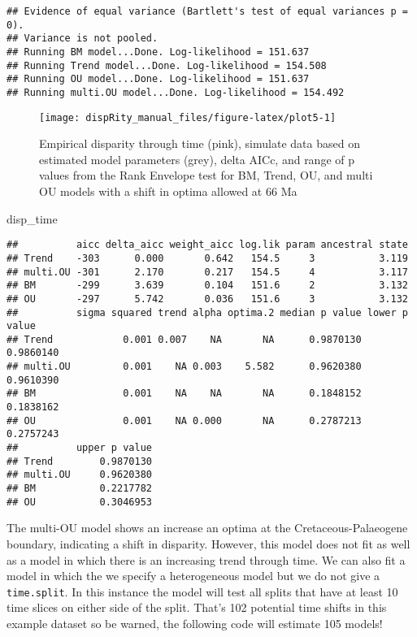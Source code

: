 \documentclass[
]{book}
\newenvironment{Shaded}{\begin{snugshade}}{\end{snugshade}}
\newcommand{\NormalTok}[1]{#1}
\begin{document}
\begin{verbatim}
## Evidence of equal variance (Bartlett's test of equal variances p = 0).
## Variance is not pooled.
## Running BM model...Done. Log-likelihood = 151.637
## Running Trend model...Done. Log-likelihood = 154.508
## Running OU model...Done. Log-likelihood = 151.637
## Running multi.OU model...Done. Log-likelihood = 154.492
\end{verbatim}

\begin{figure}

{\centering \texttt{[image: dispRity\_manual\_files/figure-latex/plot5-1]} 

}

\caption{Empirical disparity through time (pink), simulate data based on estimated model parameters (grey), delta AICc, and range of p values from the Rank Envelope test for BM, Trend, OU, and multi OU models with a shift in optima allowed at 66 Ma}\label{fig:plot5}
\end{figure}

\begin{Shaded}
\begin{Highlighting}[]
\NormalTok{disp\_time}
\end{Highlighting}
\end{Shaded}

\begin{verbatim}
##          aicc delta_aicc weight_aicc log.lik param ancestral state
## Trend    -303      0.000       0.642   154.5     3           3.119
## multi.OU -301      2.170       0.217   154.5     4           3.117
## BM       -299      3.639       0.104   151.6     2           3.132
## OU       -297      5.742       0.036   151.6     3           3.132
##          sigma squared trend alpha optima.2 median p value lower p value
## Trend            0.001 0.007    NA       NA      0.9870130     0.9860140
## multi.OU         0.001    NA 0.003    5.582      0.9620380     0.9610390
## BM               0.001    NA    NA       NA      0.1848152     0.1838162
## OU               0.001    NA 0.000       NA      0.2787213     0.2757243
##          upper p value
## Trend        0.9870130
## multi.OU     0.9620380
## BM           0.2217782
## OU           0.3046953
\end{verbatim}

The multi-OU model shows an increase an optima at the Cretaceous-Palaeogene boundary, indicating a shift in disparity.
However, this model does not fit as well as a model in which there is an increasing trend through time.
We can also fit a model in which the we specify a heterogeneous model but we do not give a \texttt{time.split}.
In this instance the model will test all splits that have at least 10 time slices on either side of the split.
That's 102 potential time shifts in this example dataset so be warned, the following code will estimate 105 models!
\end{document}
